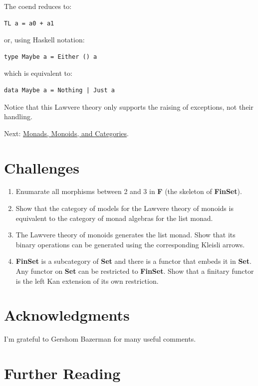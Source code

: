 The coend reduces to:

\begin{Verbatim}[commandchars=\\\{\}]
TL a = a0 + a1
\end{Verbatim}

or, using Haskell notation:

\begin{Verbatim}[commandchars=\\\{\}]
type Maybe a = Either () a
\end{Verbatim}

which is equivalent to:

\begin{Verbatim}[commandchars=\\\{\}]
data Maybe a = Nothing | Just a
\end{Verbatim}

Notice that this Lawvere theory only supports the raising of exceptions,
not their handling.

Next:
\href{https://bartoszmilewski.com/2017/09/06/monads-monoids-and-categories/}{Monads,
Monoids, and Categories}.

\section{Challenges}\label{challenges}

\begin{enumerate}
\tightlist
\item
  Enumarate all morphisms between 2 and 3 in \textbf{F} (the skeleton of
  \textbf{FinSet}).
\item
  Show that the category of models for the Lawvere theory of monoids is
  equivalent to the category of monad algebras for the list monad.
\item
  The Lawvere theory of monoids generates the list monad. Show that its
  binary operations can be generated using the corresponding Kleisli
  arrows.
\item
  \textbf{FinSet} is a subcategory of \textbf{Set} and there is a
  functor that embeds it in \textbf{Set}. Any functor on \textbf{Set}
  can be restricted to \textbf{FinSet}. Show that a finitary functor is
  the left Kan extension of its own restriction.
\end{enumerate}

\section{Acknowledgments}\label{acknowledgments}

I'm grateful to Gershom Bazerman for many useful comments.

\section{Further Reading}\label{further-reading}
